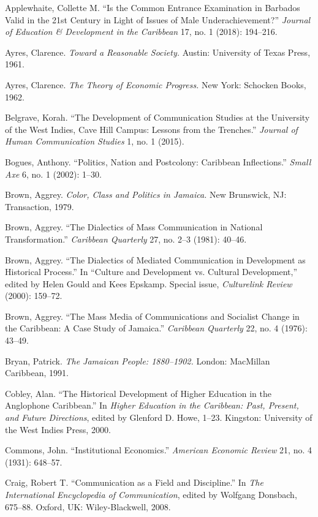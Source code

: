 \documentclass{tufte-handout}
\begin{document}
\begin{hangparas}{.25in}{1} 



Applewhaite, Collette M. ``Is the Common Entrance Examination in
Barbados Valid in the 21st Century in Light of Issues of Male
Underachievement?'' \emph{Journal of Education \& Development in the
Caribbean} 17, no. 1 (2018): 194--216.

Ayres, Clarence. \emph{Toward a Reasonable Society.} Austin: University
of Texas Press, 1961.

Ayres, Clarence. \emph{The Theory of Economic Progress.} New York:
Schocken Books, 1962.

Belgrave, Korah. ``The Development of Communication Studies at the
University of the West Indies, Cave Hill Campus: Lessons from the
Trenches.'' \emph{Journal of Human Communication Studies} 1, no. 1
(2015).

Bogues, Anthony. ``Politics, Nation and Postcolony: Caribbean
Inflections.'' \emph{Small Axe} 6, no. 1 (2002): 1--30.

Brown, Aggrey. \emph{Color, Class and Politics in Jamaica.} New
Brunswick, NJ: Transaction, 1979.

Brown, Aggrey. ``The Dialectics of Mass Communication in National
Transformation.'' \emph{Caribbean Quarterly} 27, no. 2--3 (1981):
40--46.

Brown, Aggrey. ``The Dialectics of Mediated Communication in Development
as Historical Process.'' In ``Culture and Development vs. Cultural
Development,'' edited by Helen Gould and Kees Epskamp. Special issue,
\emph{Culturelink Review} (2000): 159--72.

Brown, Aggrey. ``The Mass Media of Communications and Socialist Change
in the Caribbean: A Case Study of Jamaica.'' \emph{Caribbean Quarterly}
22, no. 4 (1976): 43--49.

Bryan, Patrick. \emph{The Jamaican People: 1880--1902.} London:
MacMillan Caribbean, 1991.

Cobley, Alan. ``The Historical Development of Higher Education in the
Anglophone Caribbean.'' In \emph{Higher Education in the Caribbean:
Past, Present, and Future Directions}, edited by Glenford D. Howe,
1--23. Kingston: University of the West Indies Press, 2000.

Commons, John. ``Institutional Economics.'' \emph{American Economic
Review} 21, no. 4 (1931): 648--57.

Craig, Robert T. ``Communication as a Field and Discipline.'' In
\emph{The International Encyclopedia of Communication}, edited by
Wolfgang Donsbach, 675--88. Oxford, UK: Wiley-Blackwell, 2008.


\end{hangparas}
\end{document}
